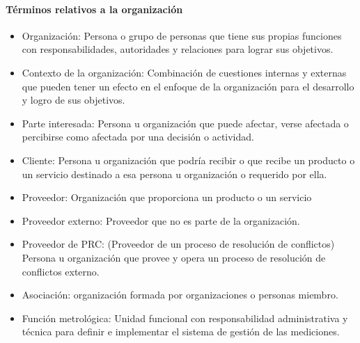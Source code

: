 					\paragraph{Términos relativos a la organización}
						\begin{itemize}
							\item Organización: Persona o grupo de personas que tiene sus propias funciones con responsabilidades, autoridades y
							relaciones para lograr sus objetivos.
							
							\item Contexto de la organización: Combinación de cuestiones internas y externas que pueden tener un efecto en el enfoque de la
							organización para el desarrollo y logro de sus objetivos.
							
							\item Parte interesada: Persona u organización que puede afectar, verse afectada o percibirse como afectada por una
							decisión o actividad.
							
							\item Cliente: Persona u organización  que podría recibir o que recibe un producto o un servicio
							destinado a esa persona u organización o requerido por ella.
							
							\item Proveedor: Organización que proporciona un producto o un servicio
							
							\item Proveedor externo: Proveedor que no es parte de la organización.
							
							\item Proveedor de PRC: (Proveedor de un proceso de resolución de conflictos)
							Persona u organización que provee y opera un proceso de resolución de conflictos externo.
							
							\newpage
							\thispagestyle{plain}
							
							\item Asociación:  organización formada por organizaciones o personas miembro. 
							
							\item Función metrológica: Unidad funcional con responsabilidad administrativa y técnica para definir e implementar el sistema de
							gestión de las mediciones.
							
						\end{itemize}
					
